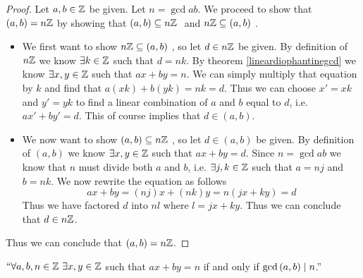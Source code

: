         \begin{proof}
            Let $a, b \in \mathbb{Z}$ be given. Let $n = \gcd{a}{b}$. We proceed to show
            that $(a, b) = n\mathbb{Z}$ by showing that $(a, b) \subseteq n\mathbb{Z} \ $ and 
            $n\mathbb{Z} \subseteq (a, b) \ $.
            \begin{itemize}
                \item
                    We first want to show $n\mathbb{Z} \subseteq (a, b) \ $, so let $d \in n\mathbb{Z}$ be
                    given. By definition of $n\mathbb{Z}$ we know $\exists k \in \mathbb{Z}$ such
                    that $d = nk$. By theorem \ref{lineardiophantinegcd} we know $\exists
                    x, y \in \mathbb{Z}$ such that $ax + by = n$. We can simply multiply that
                    equation by $k$ and find that $a(xk) + b(yk) = nk = d$. Thus we can choose
                    $x' = xk$ and $y' = yk$ to find a linear combination of $a$ and $b$ equal to
                    $d$, i.e. $ax' + by' = d$. This of course implies that $d \in (a, b)$.
                \item
                    We now want to show $(a, b) \subseteq n\mathbb{Z} \ $, so let $d \in (a, b)$
                    be given. By definition of $(a, b)$ we know $\exists x, y \in \mathbb{Z}$
                    such that $ax + by = d$. Since $n = \gcd{a}{b}$ we know that $n$ must
                    divide both $a$ and $b$, i.e. $\exists j, k \in \mathbb{Z}$ such that
                    $a = nj$ and $b = nk$. We now rewrite the equation as follows
                    \[
                        ax + by = (nj)x + (nk)y = n(jx + ky) = d
                    \]
                    Thus we have factored $d$ into $nl$ where $l = jx + ky$. Thus we can conclude
                    that $d \in n\mathbb{Z}$.
            \end{itemize}
            Thus we can conclude that $(a, b) = n\mathbb{Z}$. \QED
        \end{proof}
        \begin{corollary}
            $``\forall a, b, n \in \mathbb{Z} \ \exists x, y \in \mathbb{Z}$ such that
            $ax + by = n$ if and only if $\mathrm{gcd}\left(a, b\right) \mid n$.''
            \label{ax + by = n <==> gcd(a, b) | n}
        \end{corollary}
